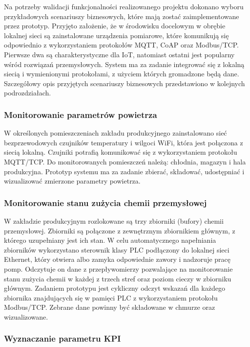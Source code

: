 \documentclass[a4paper, 12pt, twoside]{article}
\begin{document}
Na potrzeby walidacji funkcjonalności realizowanego projektu dokonano wyboru przykładowych
scenariuszy biznesowych, które mają zostać zaimplementowane przez prototyp.
Przyjęto założenie, że w środowisku docelowym w obrębie lokalnej sieci
są zainstalowane urządzenia pomiarowe, które komunikują się odpowiednio
z wykorzystaniem protokołów
MQTT, CoAP oraz Modbus/TCP. Pierwsze dwa są charakterystyczne dla IoT, natomiast
ostatni jest popularny wśród rozwiązań przemysłowych. System ma za zadanie
integrować się z lokalną siecią i wymienionymi protokołami, z użyciem
których gromadzone będą dane. Szczegółowy opis przyjętych scenariuszy biznesowych
przedstawiono w kolejnych podrozdziałach.

\subsubsection{Monitorowanie parametrów powietrza}

W określonych pomieszczeniach zakładu produkcyjnego zainstalowano sieć bezprzewodowych
czujników temperatury i wilgoci WiFi, która jest połączona z siecią lokalną.
Czujniki potrafią komunikować się z wykorzystaniem protokołu MQTT/TCP. Do monitorowanych
pomieszczeń należą: chłodnia, magazyn i hala produkcyjna. Prototyp systemu ma za zadanie
zbierać, składować, udostępniać i wizualizować zmierzone parametry powietrza.

\subsubsection{Monitorowanie stanu zużycia chemii przemysłowej}

W zakładzie produkcyjnym rozlokowane są trzy zbiorniki (bufory) chemii przemysłowej.
Zbiorniki są połączone z zewnętrznym zbiornikiem głównym, z którego uzupełniany
jest ich stan. W celu automatycznego napełniania zbiorników wykorzystano sterownik
klasy PLC podłączony do lokalnej sieci Ethernet, który otwiera albo zamyka
odpowiednie zawory i nadzoruje pracę pomp.
Odczytuje on dane z przepływomierzy pozwalające na monitorowanie stanu
zużycia chemii w każdej z trzech stref oraz poziom cieczy w zbiorniku głównym.
Zadaniem prototypu jest cykliczny odczyt wskazań dla każdego
zbiornika znajdujących się w pamięci PLC z wykorzystaniem protokołu Modbus/TCP.
Zebrane dane powinny być składowane w chmurze oraz wizualizowane.

\subsubsection{Wyznaczanie parametru KPI}
\end{document}
